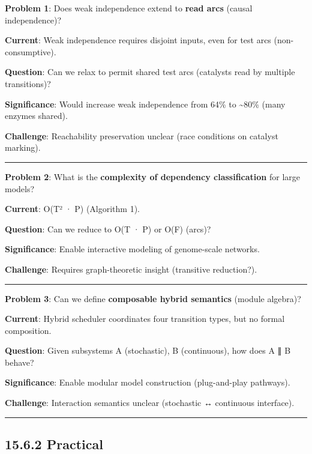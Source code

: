 \textbf{Problem 1}: Does weak independence extend to \textbf{read arcs}
(causal independence)?

\textbf{Current}: Weak independence requires disjoint inputs, even for
test arcs (non-consumptive).

\textbf{Question}: Can we relax to permit shared test arcs (catalysts
read by multiple transitions)?

\textbf{Significance}: Would increase weak independence from 64\% to
\textasciitilde80\% (many enzymes shared).

\textbf{Challenge}: Reachability preservation unclear (race conditions
on catalyst marking).

\begin{center}\rule{0.5\linewidth}{0.5pt}\end{center}

\textbf{Problem 2}: What is the \textbf{complexity of dependency
classification} for large models?

\textbf{Current}: O(\textbar T\textbar² · \textbar P\textbar) (Algorithm
1).

\textbf{Question}: Can we reduce to O(\textbar T\textbar{} ·
\textbar P\textbar) or O(\textbar F\textbar) (arcs)?

\textbf{Significance}: Enable interactive modeling of genome-scale
networks.

\textbf{Challenge}: Requires graph-theoretic insight (transitive
reduction?).

\begin{center}\rule{0.5\linewidth}{0.5pt}\end{center}

\textbf{Problem 3}: Can we define \textbf{composable hybrid semantics}
(module algebra)?

\textbf{Current}: Hybrid scheduler coordinates four transition types,
but no formal composition.

\textbf{Question}: Given subsystems A (stochastic), B (continuous), how
does A ∥ B behave?

\textbf{Significance}: Enable modular model construction (plug-and-play
pathways).

\textbf{Challenge}: Interaction semantics unclear (stochastic ↔
continuous interface).

\begin{center}\rule{0.5\linewidth}{0.5pt}\end{center}

\hypertarget{practical}{%
\subsection{15.6.2 Practical}\label{practical}}

